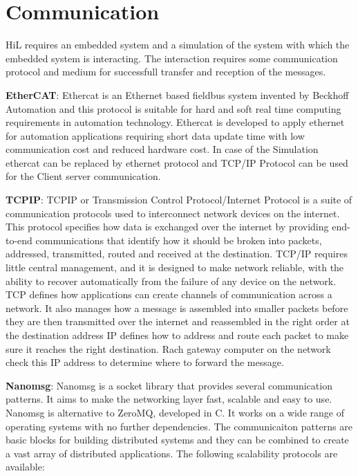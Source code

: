 \documentclass{listhesis}
\begin{document}
\section{Communication} HiL requires an embedded system and a simulation of the system with which the embedded system is interacting. The interaction requires some communication protocol and medium for successfull transfer and reception of the messages.
\\
\par
\textbf{EtherCAT}: Ethercat is an Ethernet based fieldbus system invented by Beckhoff Automation and this protocol is suitable for hard and soft real time computing requirements in automation technology. Ethercat is developed to apply ethernet for automation applications requiring short data update time with low communication cost and reduced hardware cost.
In case of the Simulation ethercat can be replaced by ethernet protocol and TCP/IP Protocol can be used for the Client server communication. 
\\
\par
\textbf{TCPIP}: TCPIP or Transmission Control Protocol/Internet Protocol is a suite of communication protocols used to interconnect network devices on the internet. This protocol specifies how data is exchanged over the internet by providing end-to-end communications that identify how it should be broken into packets, addressed, transmitted, routed and received at the destination. TCP/IP requires little central management, and it is designed to make network reliable, with the ability to recover automatically from the failure of any device on the network. TCP defines how applications can create channels of communication across a network. It also manages how a message is assembled into smaller packets before they are then transmitted over the internet and reassembled in the right order at the destination address
IP defines how to address and route each packet to make sure it reaches the right destination. Rach gateway computer on the network check this IP address to determine where to forward the message. 
\\
\par
\textbf{Nanomsg}: Nanomsg is a socket library that provides several communication patterns. It aims to make the networking layer fast, scalable and easy to use. Nanomsg is alternative to ZeroMQ, developed in C. It works on a wide range of operating systems with no further dependencies. The communicaiton patterns are basic blocks for building distributed systems and they can be combined to create a vast array of distributed applications. The following scalability protocols are available:\\
\end{document}
